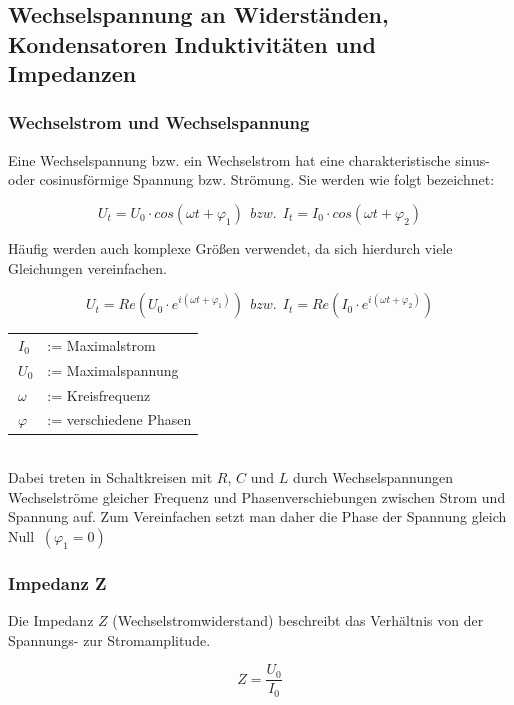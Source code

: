 \subsection{Wechselspannung an Widerständen, Kondensatoren 
Induktivitäten und Impedanzen }
\subsubsection{Wechselstrom und Wechselspannung}
Eine Wechselspannung bzw. ein Wechselstrom hat eine charakteristische sinus- oder cosinusförmige Spannung bzw. Strömung. Sie werden wie folgt bezeichnet:

\begin{equation}
\label{4}
U_{t}=U_{0}\cdot cos(\omega t+\varphi _{1})\ \ bzw.\ \ I_{t}=I_{0}\cdot cos(\omega t+\varphi _{2})
\end{equation}

Häufig werden auch komplexe Größen verwendet, da sich hierdurch viele Gleichungen vereinfachen.

\begin{equation}
\label{komplex}
U_{t}=Re \left( U_{0}\cdot e^{i\left(\omega t+\varphi _{1}\right)}\right)\ \ bzw.\ \  I_{t}=Re \left(I_{0}\cdot e^{i\left(\omega t+\varphi _{2}\right)}\right)
\end{equation}

\begin{tabular}{l l}
\(\ I_{0}\)	&	:= Maximalstrom\\
\(\ U_{0}\) &	:= Maximalspannung\\
\(\ \omega\)&	:= Kreisfrequenz\\
\(\ \varphi\)&	:= verschiedene Phasen
\end{tabular}\\

Dabei treten in Schaltkreisen mit \(R\), \(C\) und \(L\) durch Wechselspannungen Wechselströme gleicher Frequenz und Phasenverschiebungen zwischen Strom und Spannung auf. Zum Vereinfachen setzt man daher die Phase der Spannung gleich Null \(\ (\varphi _{1}=0)\) \\

\subsubsection{Impedanz Z}
Die Impedanz \(Z\) (Wechselstromwiderstand) beschreibt das Verhältnis von der Spannungs- zur Stromamplitude.

\begin{equation}
\label{5}
Z=\frac{U_{0}}{I_{0}}
\end{equation}

